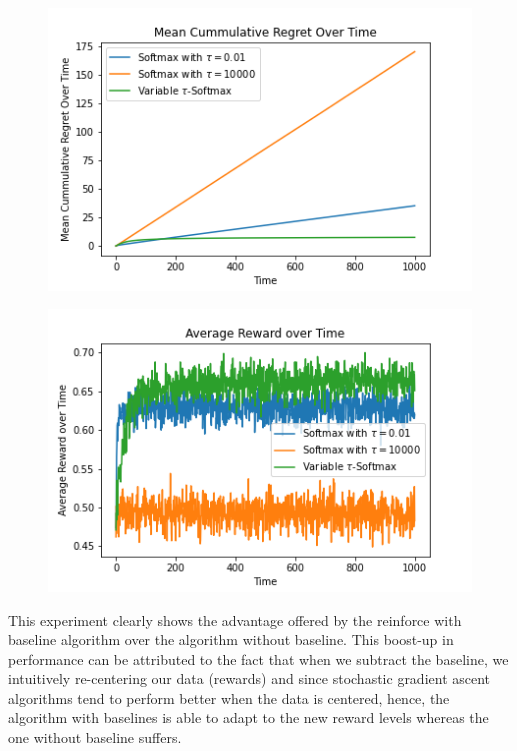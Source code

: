 \documentclass{article}
\begin{document}
	\begin{figure}[H]
	\graphicspath{ {../Experiments/Interesting_Reinforce/} }
	\centering
	\begin{minipage}{.5\textwidth}
	  \centering
	  \includegraphics[width=\linewidth]{Mean_Cummulative_Regret_Over_Time.png}
	  \label{fig:test1}
	\end{minipage}%
	\begin{minipage}{.5\textwidth}
	  \centering
	  \includegraphics[width=\linewidth]{Average_Reward_over_Time.png}
	  \label{fig:test2}
	\end{minipage}
	\end{figure}
	
	This experiment clearly shows the advantage offered by the reinforce with baseline algorithm over the algorithm without baseline. This boost-up in performance
	can be attributed to the fact that when we subtract the baseline, we intuitively re-centering our data (rewards) and since stochastic gradient ascent algorithms
	tend to perform better when the data is centered, hence, the algorithm with baselines is able to adapt to the new reward levels whereas the one without baseline
	suffers.
		
		
\end{document}
